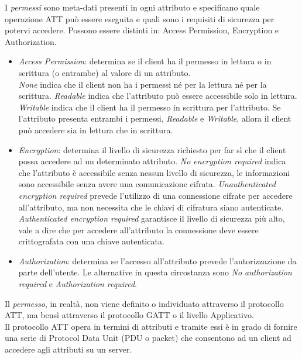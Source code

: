 I \textit{permessi} sono meta-dati presenti in ogni attributo e specificano quale operazione ATT può essere eseguita e quali sono i requisiti di sicurezza per potervi accedere. Possono essere distinti in: Access Permission, Encryption e Authorization.
\begin{itemize}
    \item \textit{Access Permission}: determina se il client ha il permesso in lettura o in scrittura (o entrambe) al valore di un attributo.\\
    \textit{None} indica che il client non ha i permessi né per la lettura né per la scrittura.
    \textit{Readable} indica che l'attributo può essere accessibile solo in lettura.
    \textit{Writable} indica che il client ha il permesso in scrittura per l'attributo.
    Se l'attributo presenta entrambi i permessi, \textit{Readable} e \textit{Writable}, allora il client può accedere sia in lettura che in scrittura.
    
    \item \textit{Encryption}: determina il livello di sicurezza richiesto per far sì che il client possa accedere ad un determinato attributo.
    \textit{No encryption required} indica che l'attributo è accessibile senza nessun livello di sicurezza, le informazioni sono accessibile senza avere una comunicazione cifrata.
    \textit{Unauthenticated encryption required} prevede l'utilizzo di una connessione cifrate per accedere all'attributo, ma non necessita che le chiavi di cifratura siano autenticate.
    \textit{Authenticated encryption required} garantisce il livello di sicurezza più alto, vale a dire che per accedere all'attributo la connessione deve essere crittografata con una chiave autenticata.
    
    \item \textit{Authorization}: determina se l'accesso all'attributo prevede l'autorizzazione da parte dell'utente. Le alternative in questa circostanza sono \textit{No authorization required} e \textit{Authorization required}.
\end{itemize}
\noindent Il \textit{permesso}, in realtà, non viene definito o individuato attraverso il protocollo ATT, ma bensì attraverso il protocollo GATT o il livello Applicativo.\\

\noindent Il protocollo ATT opera in termini di attributi e tramite essi è in grado di fornire una serie di Protocol Data Unit (PDU o packet) che consentono ad un client ad accedere agli attributi su un server.

